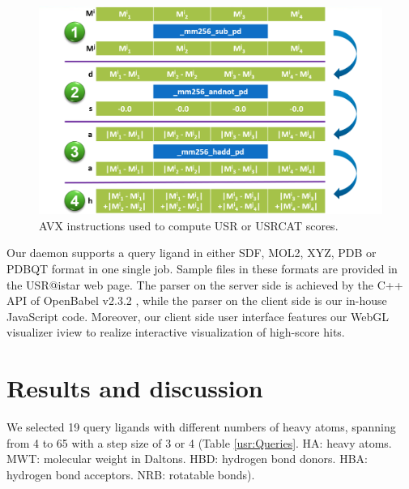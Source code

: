 \begin{figure}
\begin{center}
\includegraphics[width=\linewidth]{../usr/AVX.png}
\end{center}
\caption{AVX instructions used to compute USR or USRCAT scores.}
\label{usr:AVX}
\end{figure}

Our daemon supports a query ligand in either SDF, MOL2, XYZ, PDB or PDBQT format in one single job. Sample files in these formats are provided in the USR@istar web page. The parser on the server side is achieved by the C++ API of OpenBabel v2.3.2 \citep{968}, while the parser on the client side is our in-house JavaScript code. Moreover, our client side user interface features our WebGL visualizer iview \citep{1366} to realize interactive visualization of high-score hits.

\section{Results and discussion}

We selected 19 query ligands with different numbers of heavy atoms, spanning from 4 to 65 with a step size of 3 or 4 (Table \ref{usr:Queries}. HA: heavy atoms. MWT: molecular weight in Daltons. HBD: hydrogen bond donors. HBA: hydrogen bond acceptors. NRB: rotatable bonds).

